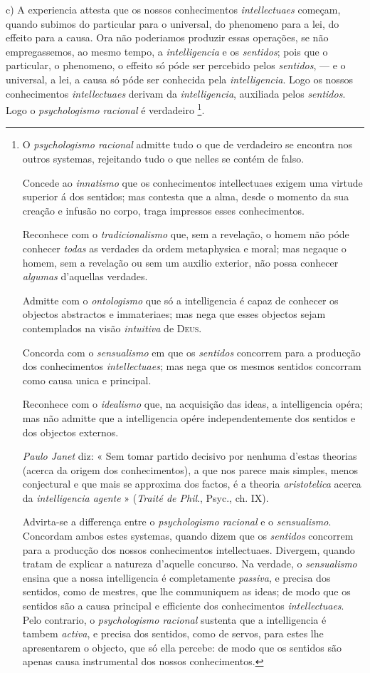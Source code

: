 c) A experiencia attesta que os nossos conhecimentos \emph{intellectuaes} começam, quando subimos do particular para o universal, do phenomeno para a lei, do effeito para a causa. Ora não poderiamos produzir essas operações, se não empregassemos, ao mesmo tempo, a \emph{intelligencia} e os \emph{sentidos}; pois que o particular, o phenomeno, o effeito só póde ser percebido pelos \emph{sentidos}, --- e o universal, a lei, a causa só póde ser conhecida pela \emph{intelligencia}. Logo os nossos conhecimentos \emph{intellectuaes} derivam da \emph{intelligencia}, auxiliada pelos \emph{sentidos}. Logo o \emph{psychologismo racional} é verdadeiro \footnote{O \emph{psychologismo racional} admitte tudo o que de verdadeiro se encontra nos outros systemas, rejeitando tudo o que nelles se contém de falso.\par Concede ao \emph{innatismo} que os conhecimentos intellectuaes exigem uma virtude superior á dos sentidos; mas contesta que a alma, desde o momento da sua creação e infusão no corpo, traga impressos esses conhecimentos.\par Reconhece com o \emph{tradicionalismo} que, sem a revelação, o homem não póde conhecer \emph{todas} as verdades da ordem metaphysica e moral; mas negaque o homem, sem a revelação ou sem um auxilio exterior, não possa conhecer \emph{algumas} d'aquellas verdades.\par Admitte com o \emph{ontologismo} que só a intelligencia é capaz de conhecer os objectos abstractos e immateriaes; mas nega que esses objectos sejam contemplados na visão \emph{intuitiva} de \textsc{Deus}.\par Concorda com o \emph{sensualismo} em que os \emph{sentidos} concorrem para a producção dos conhecimentos \emph{intellectuaes}; mas nega que os mesmos sentidos concorram como causa unica e principal.\par Reconhece com o \emph{idealismo} que, na acquisição das ideas, a intelligencia opéra; mas não admitte que a intelligencia opére independentemente dos sentidos e dos objectos externos.\par \emph{Paulo Janet} diz: « Sem tomar partido decisivo por nenhuma d'estas theorias (acerca da origem dos conhecimentos), a que nos parece mais simples, menos conjectural e que mais se approxima dos factos, é a theoria \emph{aristotelica} acerca da \emph{intelligencia agente} » (\emph{Traité de Phil}., Psyc., ch. IX).\par Advirta-se a differença entre o \emph{psychologismo racional} e o \emph{sensualismo}. Concordam ambos estes systemas, quando dizem que os \emph{sentidos} concorrem para a producção dos nossos conhecimentos intellectuaes. Divergem, quando tratam de explicar a natureza d'aquelle concurso. Na verdade, o \emph{sensualismo} ensina que a nossa intelligencia é completamente \emph{passiva}, e precisa dos sentidos, como de mestres, que lhe communiquem as ideas; de modo que os sentidos são a causa principal e efficiente dos conhecimentos \emph{intellectuaes}. Pelo contrario, o \emph{psychologismo racional} sustenta que a intelligencia é tambem \emph{activa}, e precisa dos sentidos, como de servos, para estes lhe apresentarem o objecto, que só ella percebe: de modo que os sentidos são apenas causa instrumental dos nossos conhecimentos.}.

